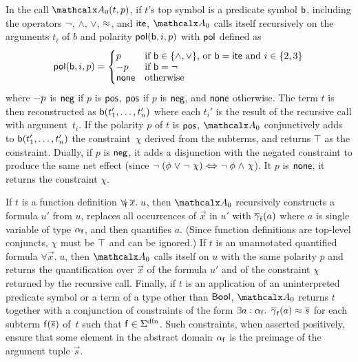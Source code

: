 In the call $\conv_0(t, p)$, if $t$'s top symbol is a predicate symbol $\mathsf{b}$, including the
operators ${\oldneg}$, ${\wedge}$, ${\vee}$, ${\approx}$, and ${\mathsf{ite}}$,
$\conv_0$ calls itself recursively on the arguments $t_i$ of $b$ and polarity 
$\mathsf{pol}(\mathsf{b}, i, p )$ with $\mathsf{pol}$ defined as
\[\pol( \boolop, i, p ) =
\begin{cases}
p & \text{if $\boolop \in \{{\wedge}, {\vee}\}$, or $\boolop = \lite$ and $i \in \{2, 3\}$} \\[-\jot]
\pnegate p & \text{if $\boolop = {\neg}$} \\[-\jot]
\pnone & \text{otherwise}
\end{cases}\]
where $- p$ is $\mathsf{neg}$ if $p$ is $\mathsf{pos}$, $\mathsf{pos}$
if $p$ is $\mathsf{neg}$, and $\mathsf{none}$ otherwise.
The term $t$ is then reconstructed as $\mathsf{b}(t_1',\dotsc,t_n')$
where each $t_i'$ is the result of the recursive call with argument~$t_i$.
If the polarity $p$ of $t$ is $\mathsf{pos}$,
$\conv_0$ conjunctively adds to $\mathsf{b}(t_1',\dotsc,t_n')$ the constraint~$\chi$ derived from
the subterms, and returns $\top$ as the constraint.
Dually, if $p$ is $\mathsf{neg}$, it adds a
disjunction with the negated constraint to produce the same net effect
(since $\lnot\;(\phi \mathrel\lor \lnot\;\chi) \Medleftrightarrow \lnot\;\phi \mathrel\land \chi$).
It $p$ is $\mathsf{none}$, it returns the constraint $\chi$.

If $t$ is a function definition $\forall_{\!\mathsf{f}\:} \overline{x}.\; u$, %
then $\conv_0$ recursively constructs a formula $u'$ from $u$,
replaces all occurrences of $\vec x$ in $u'$ with $\overline{\gamma}_{\mathsf{f}}( a )$
where $a$ is single variable of type $\alpha_{\mathsf{f}}$,
and then quantifies $a$.
(Since function definitions are top-level conjuncts, %
$\chi$ must be $\top$ and can be ignored.)
%
If $t$ is an unannotated quantified formula $\forall \vec x.\; u$, then $\conv_0$ calls itself
on $u$ with the same polarity $p$ and returns the quantification over $\vec x$ 
of the formula $u'$ and of the constraint $\chi$ returned by the recursive call.
Finally, if $t$ is an application of an uninterpreted predicate symbol or a term
of a type other than $\mathsf{Bool}$, $\conv_0$ returns $t$ together with a conjunction of
constraints of the form $\exists a : {\alpha_{\mathsf{f}}}.\;\, \overline{\gamma}_{\mathsf{f}}(
a ) \approx \overline{s}$ for each subterm $\mathsf{f}( \overline{s} )$ of~$t$ such that $\con{f}
\in \sfundefs{\Sigma}$. Such constraints, when asserted positively, ensure that
some element in the abstract domain $\alpha_{\mathsf{f}}$ is the preimage of
the argument tuple $\vec s$. %

